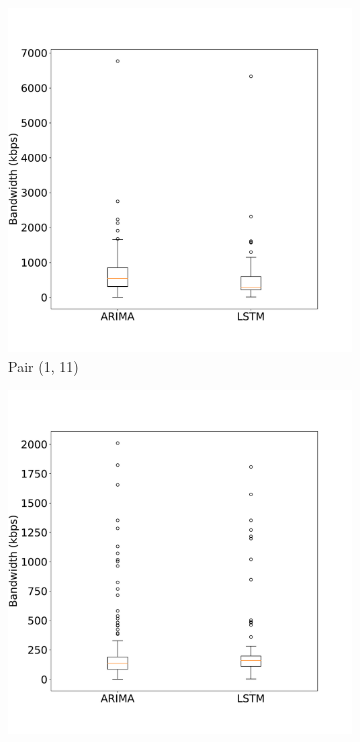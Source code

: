 \begin{figure}
	\centering
	\begin{subfigure}{0.42\linewidth}
		\centering
		\includegraphics[width=1\linewidth]{Pictures/Practical_Examples/BoxERRORprediction_0}
		\caption{Pair (1, 11)}
		\label{fig:BoxERRORprediction_0}
	\end{subfigure}
	\begin{subfigure}{0.42\linewidth}
		\centering
		\includegraphics[width=1\linewidth]{Pictures/Practical_Examples/BoxERRORprediction_1}

\end{subfigure}
\end{figure}
